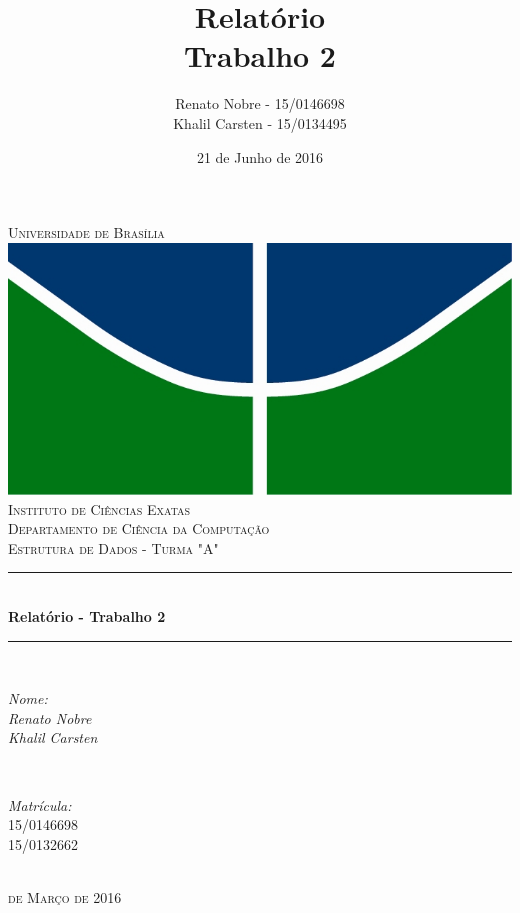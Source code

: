 \documentclass[a4paper, 12pt]{article}
\author[]{Renato Nobre - 15/0146698\\Khalil Carsten - 15/0134495}
\affil[]{Estrutura de Dados\\Universidade de Brasília}
\title{Relatório\\Trabalho 2}
\date{21 de Junho de 2016}
\begin{document}
	\begin{titlepage}

		\newcommand{\HRule}{\rule{\linewidth}{0.5mm}}
		\centering
	    \textsc{\LARGE Universidade de Brasília}\\[0.5cm]
	    \includegraphics{logo.jpg}\\[0.5cm]
		\textsc{\Large Instituto de Ciências Exatas}\\[0.5cm]
	    \textsc{\Large Departamento de Ciência da Computação}\\[0.5cm]
		\textsc{\Large Estrutura de Dados - Turma "A"}\\[0.5cm]
	    \HRule \\[0.4cm]
	    { \huge \bfseries Relatório - Trabalho 2}\\
	      \HRule \\[1.5cm]
	      	\begin{minipage}{0.4\textwidth}
	      		\begin{flushleft} \large
	      			\emph{Nome:}\\
	     			\emph{Renato Nobre}\\
	      			\emph{Khalil Carsten}\\
	      		\end{flushleft}
	      	\end{minipage}
	      	~
	      	\begin{minipage}{0.4\textwidth}
	      		\begin{flushright} \large
	      			\emph{Matrícula:}\\
	     			\textsc{15/0146698}\\
	        		\textsc{15/0132662}\\
	      		\end{flushright}
	      	\end{minipage}\\[2cm]
		\textsc{\large {} de Março de 2016}\\
	\end{titlepage}
	
\end{document}
